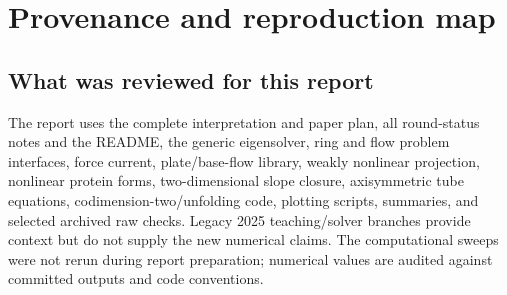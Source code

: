 \section{Provenance and reproduction map}
\subsection{What was reviewed for this report}
The report uses the complete interpretation and paper plan, all round-status notes and the README, the generic eigensolver, ring and flow problem interfaces, force current, plate/base-flow library, weakly nonlinear projection, nonlinear protein forms, two-dimensional slope closure, axisymmetric tube equations, codimension-two/unfolding code, plotting scripts, summaries, and selected archived raw checks. Legacy 2025 teaching/solver branches provide context but do not supply the new numerical claims. The computational sweeps were not rerun during report preparation; numerical values are audited against committed outputs and code conventions.


